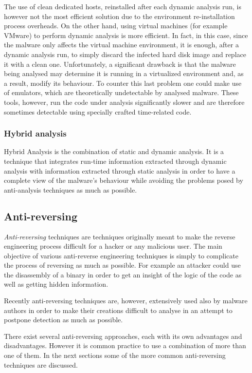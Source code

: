 \documentclass[pdfa%
,cucitura%
]{toptesi}
\begin{document}
The use of clean dedicated hosts, reinstalled after each dynamic analysis run, is however not the most efficient solution due to the environment re-installation process overheads. On the other hand, using virtual machines (for example VMware) to perform dynamic analysis is more efficient. In fact, in this case, since the malware only affects the virtual machine environment, it is enough, after a dynamic analysis run, to simply discard the infected hard disk image and replace it with a clean one. Unfortunately, a significant drawback is that the malware being analysed may determine it is running in a virtualized environment and, as a result, modify its behaviour. To counter this last problem one could make use of emulators, which are theoretically undetectable by analysed malware. These tools, however, run the code under analysis significantly slower and are therefore sometimes detectable using specially crafted time-related code.

\subsubsection{Hybrid analysis}
Hybrid Analysis is the combination of static and dynamic analysis. It is a technique that integrates run-time information extracted through dynamic analysis with information extracted  through static analysis in order to have a complete view of the malware's behaviour while avoiding the problems posed by anti-analysis techniques as much as possible.

\subsection{Anti-reversing}
\textit{Anti-reversing} techniques are techniques originally meant to make the reverse engineering process difficult for a hacker or any malicious user. The main objective of various anti-reverse engineering techniques is simply to complicate the process of reversing as much as possible. For example an attacker could use the disassembly of a binary in order to get an insight of the logic of the code as well as getting hidden information.

Recently anti-reversing techniques are, however, extensively used also by malware authors in order to make their creations difficult to analyse in an attempt to postpone detection as much as possible.

There exist several anti-reversing approaches, each with its own advantages and disadvantages. However it is common practice to use a combination of more than one of them. In the next sections some of the more common anti-reversing techniques are discussed.
\end{document}
